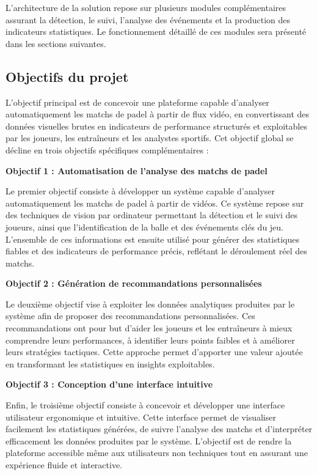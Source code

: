 \begin{itemize}
L’architecture de la solution repose sur plusieurs modules complémentaires assurant la détection, le suivi, l’analyse des événements et la production des indicateurs statistiques. Le fonctionnement détaillé de ces modules sera présenté dans les sections suivantes.

\subsection{Objectifs du projet}

L’objectif principal est de concevoir une plateforme capable d’analyser automatiquement les matchs de padel à partir de flux vidéo, en convertissant des données visuelles brutes en indicateurs de performance structurés et exploitables par les joueurs, les entraîneurs et les analystes sportifs. Cet objectif global se décline en trois objectifs spécifiques complémentaires :

\textbf{Objectif 1 : Automatisation de l’analyse des matchs de padel}  

Le premier objectif consiste à développer un système capable d’analyser automatiquement les matchs de padel à partir de vidéos. Ce système repose sur des techniques de vision par ordinateur permettant la détection et le suivi des joueurs, ainsi que l’identification de la balle et des événements clés du jeu. L’ensemble de ces informations est ensuite utilisé pour générer des statistiques fiables et des indicateurs de performance précis, reflétant le déroulement réel des matchs.

\vspace{0.3cm}

\textbf{Objectif 2 : Génération de recommandations personnalisées }  

Le deuxième objectif vise à exploiter les données analytiques produites par le système
afin de proposer des recommandations personnalisées. Ces recommandations ont pour but d’aider les joueurs et les entraîneurs à mieux comprendre leurs performances, à identifier leurs points faibles et à améliorer leurs stratégies tactiques. Cette approche permet
d’apporter une valeur ajoutée en transformant les statistiques en insights exploitables.
\vspace{0.3cm}

\textbf{Objectif 3 : Conception d’une interface intuitive}  

Enfin, le troisième objectif consiste à concevoir et développer une interface utilisateur ergonomique et intuitive. Cette interface permet de visualiser facilement les statistiques générées, de suivre l’analyse des matchs  et d’interpréter efficacement les données produites par le système. L’objectif est de rendre la plateforme accessible même aux utilisateurs non techniques tout en assurant une expérience fluide et interactive.


\end{itemize}

